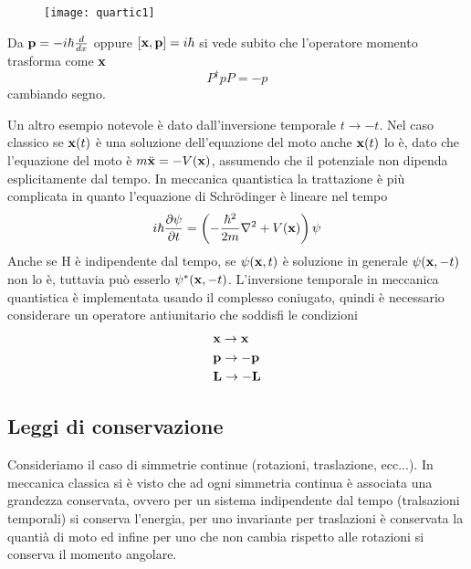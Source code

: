 \begin{figure}[ht]
\vspace{0.1in}
\texttt{[image: quartic1]}	
\centering
\end{figure}
Da $\bold{p} = -i\hbar \frac{d}{dx}$ oppure $[\bold{x},\bold{p}] =i \hbar$ si vede subito che l'operatore momento trasforma come $\bold{x}$
\begin{equation*}
	P^{\dag}pP = -p
\end{equation*}
cambiando segno.

Un altro esempio notevole \`e dato dall'inversione temporale $t \to -t$. Nel caso classico se $\bold{x}(t)$ \`e una soluzione dell'equazione del moto anche $\bold{x}(t)$ lo \`e, dato che l'equazione del moto \`e  $m \ddot{\bold{x}} = - V(\bold{x}) $, assumendo che il potenziale non dipenda esplicitamente dal tempo. In meccanica quantistica la trattazione \`e pi\`u complicata in quanto l'equazione di Schr\"odinger \`e lineare nel tempo 
\begin{equation*}
	i \hbar \frac{\partial \psi}{\partial t} = \left( -\frac{\hbar^2}{2m}\nabla^2 +V(\bold{x}) \right) \psi
\end{equation*}
Anche se H \`e indipendente dal tempo, se $\psi (\bold{x},t)$ \`e soluzione in generale $\psi(\bold{x},-t)$ non lo \`e, tuttavia pu\`o esserlo $\psi^*(\bold{x},-t)$. L'inversione temporale in meccanica quantistica \`e implementata usando il complesso coniugato, quindi \`e necessario considerare un operatore antiunitario che soddisfi le condizioni
\begin{align*}
	& \bold{x} \to \bold{x} \\
	&\bold{p} \to - \bold{p} \\
	& \bold{L} \to - \bold{L}
\end{align*}
\subsection{Leggi di conservazione}

Consideriamo il caso di simmetrie continue (rotazioni, traslazione, ecc...). In meccanica classica si \`e visto che ad ogni simmetria continua \`e associata una grandezza conservata, ovvero per un sistema indipendente dal tempo (tralsazioni temporali) si conserva l'energia, per uno invariante per traslazioni \`e conservata la quanti\`a di moto ed infine per uno che non cambia rispetto alle rotazioni si conserva il momento angolare. 

